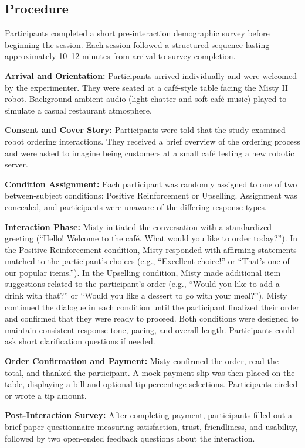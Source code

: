 \documentclass[conference]{IEEEtran}
\begin{document}
\subsection{Procedure}
Participants completed a short pre-interaction demographic survey before beginning the session. Each session followed a structured sequence lasting approximately 10--12 minutes from arrival to survey completion.

\textbf{Arrival and Orientation:} Participants arrived individually and were welcomed by the experimenter. They were seated at a café-style table facing the Misty II robot. Background ambient audio (light chatter and soft café music) played to simulate a casual restaurant atmosphere.

\textbf{Consent and Cover Story:} Participants were told that the study examined robot ordering interactions. They received a brief overview of the ordering process and were asked to imagine being customers at a small café testing a new robotic server.

\textbf{Condition Assignment:} Each participant was randomly assigned to one of two between-subject conditions: Positive Reinforcement or Upselling. Assignment was concealed, and participants were unaware of the differing response types.

\textbf{Interaction Phase:} Misty initiated the conversation with a standardized greeting (``Hello! Welcome to the café. What would you like to order today?''). In the Positive Reinforcement condition, Misty responded with affirming statements matched to the participant's choices (e.g., ``Excellent choice!'' or ``That's one of our popular items.''). In the Upselling condition, Misty made additional item suggestions related to the participant's order (e.g., ``Would you like to add a drink with that?'' or ``Would you like a dessert to go with your meal?''). Misty continued the dialogue in each condition until the participant finalized their order and confirmed that they were ready to proceed. Both conditions were designed to maintain consistent response tone, pacing, and overall length. Participants could ask short clarification questions if needed.

\textbf{Order Confirmation and Payment:} Misty confirmed the order, read the total, and thanked the participant. A mock payment slip was then placed on the table, displaying a bill and optional tip percentage selections. Participants circled or wrote a tip amount.

\textbf{Post-Interaction Survey:} After completing payment, participants filled out a brief paper questionnaire measuring satisfaction, trust, friendliness, and usability, followed by two open-ended feedback questions about the interaction.
\end{document}
